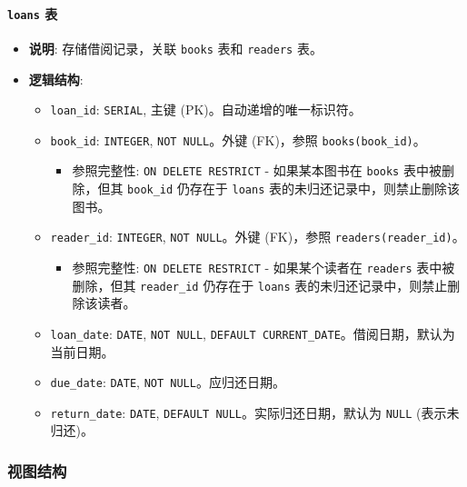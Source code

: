 \documentclass[11pt, a4paper]{article}
\begin{document}
\paragraph{\texttt{loans} 表}
\begin{itemize}
    \item \textbf{说明}: 存储借阅记录，关联 \texttt{books} 表和 \texttt{readers} 表。
    \item \textbf{逻辑结构}:
    \begin{itemize}
        \item \texttt{loan\_id}: \texttt{SERIAL}, 主键 (PK)。自动递增的唯一标识符。
        \item \texttt{book\_id}: \texttt{INTEGER}, \texttt{NOT NULL}。外键 (FK)，参照 \texttt{books(book\_id)}。
        \begin{itemize}
            \item 参照完整性: \texttt{ON DELETE RESTRICT} - 如果某本图书在 \texttt{books} 表中被删除，但其 \texttt{book\_id} 仍存在于 \texttt{loans} 表的未归还记录中，则禁止删除该图书。
        \end{itemize}
        \item \texttt{reader\_id}: \texttt{INTEGER}, \texttt{NOT NULL}。外键 (FK)，参照 \texttt{readers(reader\_id)}。
        \begin{itemize}
            \item 参照完整性: \texttt{ON DELETE RESTRICT} - 如果某个读者在 \texttt{readers} 表中被删除，但其 \texttt{reader\_id} 仍存在于 \texttt{loans} 表的未归还记录中，则禁止删除该读者。
        \end{itemize}
        \item \texttt{loan\_date}: \texttt{DATE}, \texttt{NOT NULL}, \texttt{DEFAULT CURRENT\_DATE}。借阅日期，默认为当前日期。
        \item \texttt{due\_date}: \texttt{DATE}, \texttt{NOT NULL}。应归还日期。
        \item \texttt{return\_date}: \texttt{DATE}, \texttt{DEFAULT NULL}。实际归还日期，默认为 \texttt{NULL} (表示未归还)。
    \end{itemize}
\end{itemize}

\subsubsection{视图结构}
\end{document}
